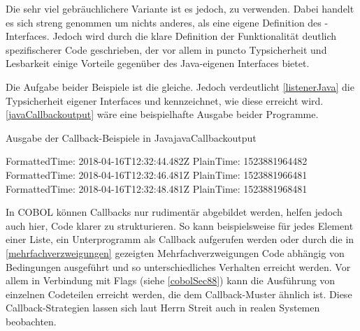 
Die sehr viel gebräuchlichere Variante ist es jedoch,  zu verwenden. Dabei handelt es sich streng genommen um nichts anderes, als eine eigene Definition des -Interfaces. Jedoch wird durch die klare Definition der Funktionalität deutlich spezifischerer Code geschrieben, der vor allem in puncto Typsicherheit und Lesbarkeit einige Vorteile gegenüber des Java-eigenen Interfaces bietet.

\clearpage


Die Aufgabe beider Beispiele ist die gleiche. Jedoch verdeutlicht \autoref{listenerJava} die Typsicherheit eigener Interfaces und kennzeichnet, wie diese erreicht wird. \autoref{javaCallbackoutput} wäre eine beispielhafte Ausgabe beider Programme.

\begin{codeWithCaption}{Ausgabe der Callback-Beispiele in Java}{javaCallbackoutput}
    \begin{shellwindow}
    FormattedTime: 2018-04-16T12:32:44.482Z
    PlainTime: 1523881964482
    FormattedTime: 2018-04-16T12:32:46.481Z
    PlainTime: 1523881966481
    FormattedTime: 2018-04-16T12:32:48.481Z
    PlainTime: 1523881968481
    \end{shellwindow}
\end{codeWithCaption}

In COBOL können Callbacks nur rudimentär abgebildet werden, helfen jedoch auch hier, Code klarer zu strukturieren. So kann beispielsweise für jedes Element einer Liste, ein Unterprogramm als Callback aufgerufen werden oder durch die in \autoref{mehrfachverzweigungen} gezeigten Mehrfachverzweigungen Code abhängig von Bedingungen ausgeführt und so unterschiedliches Verhalten erreicht werden. Vor allem in Verbindung mit Flags (siehe \autoref{cobolSec88}) kann die Ausführung von einzelnen Codeteilen erreicht werden, die dem Callback-Muster ähnlich ist. Diese Callback-Strategien lassen sich laut Herrn Streit auch in realen Systemen beobachten.